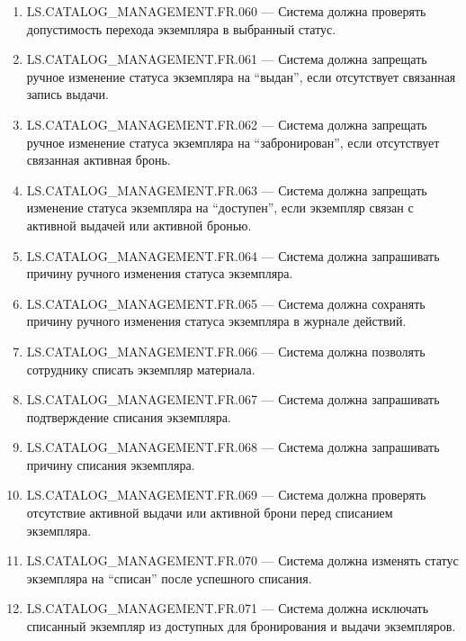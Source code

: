 \documentclass[12pt,a4paper]{article}
\begin{document}
\begin{enumerate}
		\item LS.CATALOG\_MANAGEMENT.FR.060 --- Система должна проверять допустимость
		перехода экземпляра в выбранный статус.
		
		\item LS.CATALOG\_MANAGEMENT.FR.061 --- Система должна запрещать ручное изменение
		статуса экземпляра на ``выдан'', если отсутствует связанная запись выдачи.
		
		\item LS.CATALOG\_MANAGEMENT.FR.062 --- Система должна запрещать ручное изменение
		статуса экземпляра на ``забронирован'', если отсутствует связанная активная бронь.
		
		\item LS.CATALOG\_MANAGEMENT.FR.063 --- Система должна запрещать изменение статуса
		экземпляра на ``доступен'', если экземпляр связан с активной выдачей или активной
		бронью.
		
		\item LS.CATALOG\_MANAGEMENT.FR.064 --- Система должна запрашивать причину ручного
		изменения статуса экземпляра.
		
		\item LS.CATALOG\_MANAGEMENT.FR.065 --- Система должна сохранять причину ручного
		изменения статуса экземпляра в журнале действий.
		
		\item LS.CATALOG\_MANAGEMENT.FR.066 --- Система должна позволять сотруднику
		списать экземпляр материала.
		
		\item LS.CATALOG\_MANAGEMENT.FR.067 --- Система должна запрашивать подтверждение
		списания экземпляра.
		
		\item LS.CATALOG\_MANAGEMENT.FR.068 --- Система должна запрашивать причину списания
		экземпляра.
		
		\item LS.CATALOG\_MANAGEMENT.FR.069 --- Система должна проверять отсутствие активной
		выдачи или активной брони перед списанием экземпляра.
		
		\item LS.CATALOG\_MANAGEMENT.FR.070 --- Система должна изменять статус экземпляра
		на ``списан'' после успешного списания.
		
		\item LS.CATALOG\_MANAGEMENT.FR.071 --- Система должна исключать списанный
		экземпляр из доступных для бронирования и выдачи экземпляров.
		

\end{enumerate}
\end{document}

